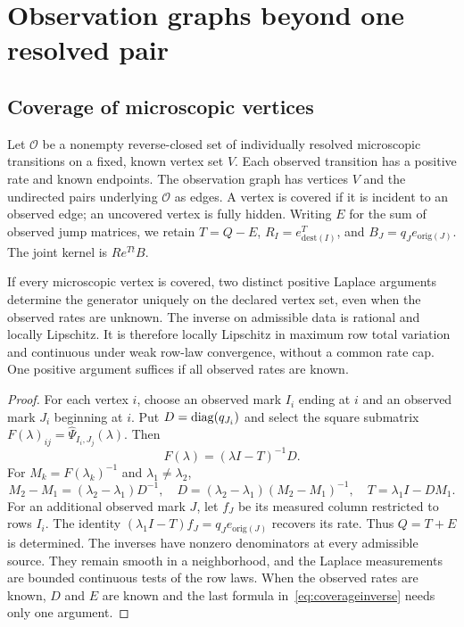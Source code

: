 \section{Observation graphs beyond one resolved pair}\label{sec:graphpriors}

\subsection{Coverage of microscopic vertices}
Let $\mathcal O$ be a nonempty reverse-closed set of individually resolved
microscopic transitions on a fixed, known vertex set $V$. Each observed
transition has a positive rate and known endpoints. The observation graph
has vertices $V$ and the undirected pairs underlying $\mathcal O$ as edges.
A vertex is covered if it is incident to an observed edge; an uncovered
vertex is fully hidden. Writing $E$ for the sum of observed jump matrices,
we retain $T=Q-E$, $R_I=e_{\mathrm{dest}(I)}^T$, and
$B_J=q_J e_{\mathrm{orig}(J)}$. The joint kernel is $Re^{Tt}B$.

\begin{proposition}\label{prop:coverage}
If every microscopic vertex is covered, two distinct positive Laplace
arguments determine the generator uniquely on the declared vertex set,
even when the observed rates are unknown. The inverse on admissible data
is rational and locally Lipschitz. It is therefore locally Lipschitz in
maximum row total variation and continuous under weak row-law convergence,
without a common rate cap. One positive argument suffices if all observed
rates are known.
\end{proposition}
\begin{proof}
For each vertex $i$, choose an observed mark $I_i$ ending at $i$ and an
observed mark $J_i$ beginning at $i$. Put $D=\operatorname{diag}(q_{J_i})$ and select
the square submatrix $F(\lambda)_{ij}=\widehat\Psi_{I_i,J_j}(\lambda)$.
Then
\begin{equation}
 F(\lambda)=(\lambda I-T)^{-1}D.
\end{equation}
For $M_k=F(\lambda_k)^{-1}$ and $\lambda_1\ne\lambda_2$,
\begin{equation}
 M_2-M_1=(\lambda_2-\lambda_1)D^{-1},\quad
 D=(\lambda_2-\lambda_1)(M_2-M_1)^{-1},\quad
 T=\lambda_1 I-DM_1.\label{eq:coverageinverse}
\end{equation}
For an additional observed mark $J$, let $f_J$ be its measured column
restricted to rows $I_i$. The identity
$(\lambda_1I-T)f_J=q_J e_{\mathrm{orig}(J)}$ recovers its rate.
Thus $Q=T+E$ is determined. The inverses have nonzero denominators at
every admissible source. They remain smooth in a neighborhood, and the
Laplace measurements are bounded continuous tests of the row laws.
When the observed rates are known, $D$ and $E$ are known and the last
formula in~\eqref{eq:coverageinverse} needs only one argument.
\end{proof}

